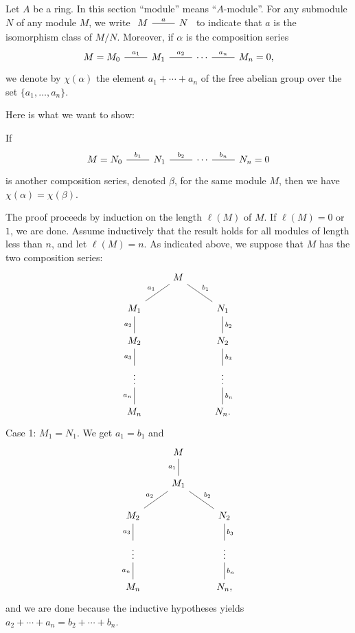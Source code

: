 \documentclass[12pt,letterpaper]{article}%
\begin{document}
Let $A$ be a ring. In this section ``module'' means ``$A$-module''. For any submodule $N$ of any module $M$, we write $\begin{tikzcd}M\ar[r,dash,"a"]&N\end{tikzcd}$ to indicate that $a$ is the isomorphism class of $M/N$. Moreover, if $\alpha$ is the composition series 
$$
\begin{tikzcd}
M=M_0\ar[r,dash,"a_1"]&M_1\ar[r,dash,"a_2"]&\cdots\ar[r,dash,"a_n"]&M_n=0,
\end{tikzcd}
$$
we denote by $\chi(\alpha)$ the element $a_1+\cdots+a_n$ of the free abelian group over the set $\{a_1,\dots,a_n\}$. 

Here is what we want to show: 

If 
$$
\begin{tikzcd}
M=N_0\ar[r,dash,"b_1"]&N_1\ar[r,dash,"b_2"]&\cdots\ar[r,dash,"b_n"]&N_n=0
\end{tikzcd}
$$
is another composition series, denoted $\beta$, for the same module $M$, then we have $\chi(\alpha)=\chi(\beta)$. 

The proof proceeds by induction on the length $\ell(M)$ of $M$. If $\ell(M)=0$ or $1$, we are done. Assume inductively that the result holds for all modules of length less than $n$, and let $\ell(M)=n$. As indicated above, we suppose that $M$ has the two composition series: 
$$
\begin{tikzcd}
&M\ar[dl,dash,"a_1"']\ar[dr,dash,"b_1"]\\ 
M_1\ar[d,dash,"a_2"']&&N_1\ar[d,dash,"b_2"]\\ 
M_2\ar[d,dash,"a_3"']&&N_2\ar[d,dash,"b_3"]\\ 
\vdots\ar[d,dash,"a_n"']&&\vdots\ar[d,dash,"b_n"]\\ 
M_n&&N_n.
\end{tikzcd}
$$ 
Case 1: $M_1=N_1$. We get $a_1=b_1$ and 
$$
\begin{tikzcd}
&M\ar[d,dash,"a_1"']\\ 
&M_1\ar[dl,dash,"a_2"']\ar[dr,dash,"b_2"]\\ 
M_2\ar[d,dash,"a_3"']&&N_2\ar[d,dash,"b_3"]\\ 
\vdots\ar[d,dash,"a_n"']&&\vdots\ar[d,dash,"b_n"]\\ 
M_n&&N_n,
\end{tikzcd}
$$ 
and we are done because the inductive hypotheses yields $a_2+\cdots+a_n=b_2+\cdots+b_n$.
\end{document}
